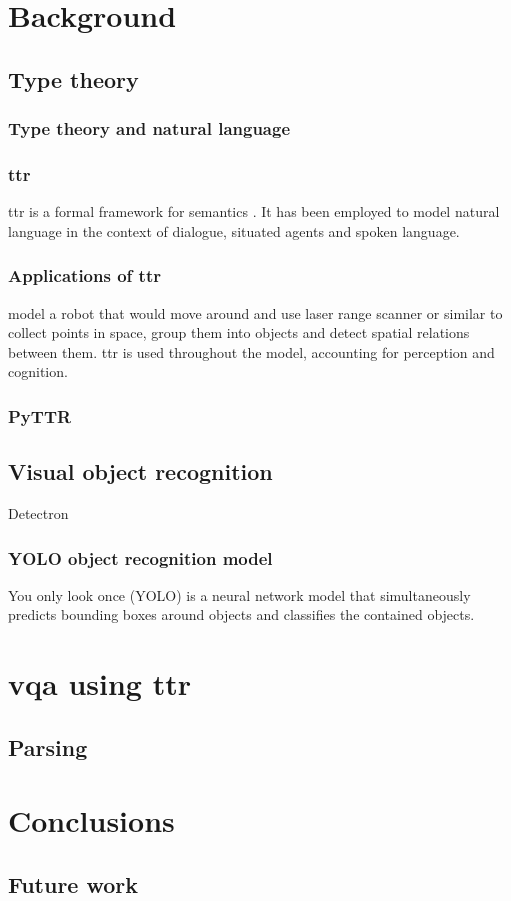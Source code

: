 \documentclass[11pt, a4paper]{article}
\begin{document}
\section{Background}

\subsection{Type theory}

\subsubsection{Type theory and natural language}

\subsubsection{\Gls{ttr}}

\gls{ttr} is a formal framework for semantics \citep{CooperRecordsRecordTypes2005}.
It has been employed to model natural language in the context of dialogue, situated agents and spoken language.

\subsubsection{Applications of \gls{ttr}}

\cite{DobnikModellinglanguageaction2012} model a robot that would move around and use laser range scanner or similar to collect points in space, group them into objects and detect spatial relations between them.
\Gls{ttr} is used throughout the model, accounting for perception and cognition.

\subsubsection{PyTTR}

\subsection{Visual object recognition}

Detectron

\subsubsection{YOLO object recognition model}

You only look once (YOLO) \citep{RedmonYouOnlyLook2015} is a neural network model that simultaneously predicts bounding boxes around objects and classifies the contained objects.

\section{\Gls{vqa} using \gls{ttr}}

\subsection{Parsing}

\section{Conclusions}

\subsection{Future work}


\end{document}
